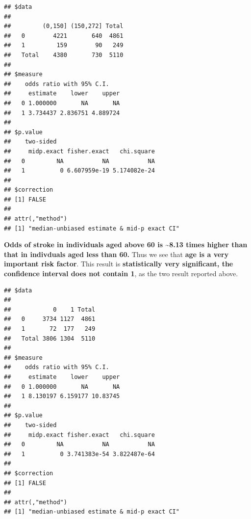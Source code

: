 \documentclass[
]{article}
\newenvironment{Shaded}{\begin{snugshade}}{\end{snugshade}}
\newcommand{\AttributeTok}[1]{\textcolor[rgb]{0.13,0.29,0.53}{#1}}
\newcommand{\DecValTok}[1]{\textcolor[rgb]{0.00,0.00,0.81}{#1}}
\newcommand{\FunctionTok}[1]{\textcolor[rgb]{0.13,0.29,0.53}{\textbf{#1}}}
\newcommand{\NormalTok}[1]{#1}
\newcommand{\OtherTok}[1]{\textcolor[rgb]{0.56,0.35,0.01}{#1}}
\newcommand{\SpecialCharTok}[1]{\textcolor[rgb]{0.81,0.36,0.00}{\textbf{#1}}}
\newcommand{\StringTok}[1]{\textcolor[rgb]{0.31,0.60,0.02}{#1}}
\begin{document}
\begin{verbatim}
## $data
##        
##         (0,150] (150,272] Total
##   0        4221       640  4861
##   1         159        90   249
##   Total    4380       730  5110
## 
## $measure
##    odds ratio with 95% C.I.
##     estimate    lower    upper
##   0 1.000000       NA       NA
##   1 3.734437 2.836751 4.889724
## 
## $p.value
##    two-sided
##     midp.exact fisher.exact   chi.square
##   0         NA           NA           NA
##   1          0 6.607959e-19 5.174082e-24
## 
## $correction
## [1] FALSE
## 
## attr(,"method")
## [1] "median-unbiased estimate & mid-p exact CI"
\end{verbatim}

\textbf{Odds of stroke in individuals aged above 60 is
\textasciitilde8.13 times higher than that in indivduals aged less than
60.} Thus we see that \textbf{age is a very important risk factor}. This
result is \textbf{statistically very significant, the confidence
interval does not contain 1}, as the two result reported above.

\begin{Shaded}
\end{Shaded}

\begin{verbatim}
## $data
##        
##            0    1 Total
##   0     3734 1127  4861
##   1       72  177   249
##   Total 3806 1304  5110
## 
## $measure
##    odds ratio with 95% C.I.
##     estimate    lower    upper
##   0 1.000000       NA       NA
##   1 8.130197 6.159177 10.83745
## 
## $p.value
##    two-sided
##     midp.exact fisher.exact   chi.square
##   0         NA           NA           NA
##   1          0 3.741383e-54 3.822487e-64
## 
## $correction
## [1] FALSE
## 
## attr(,"method")
## [1] "median-unbiased estimate & mid-p exact CI"
\end{verbatim}
\end{document}
